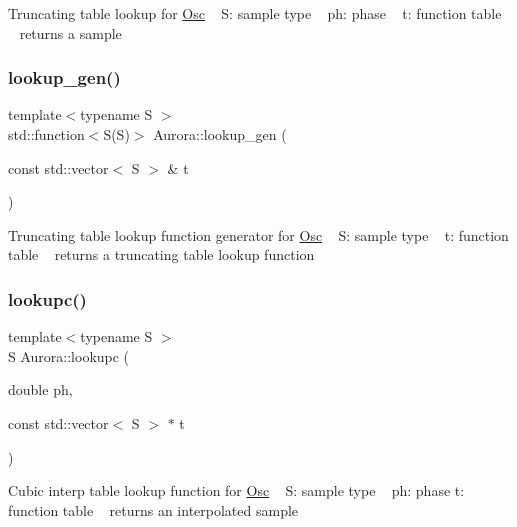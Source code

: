 Truncating table lookup for \hyperlink{class_aurora_1_1_osc}{Osc} ~\newline
S\+: sample type ~\newline
ph\+: phase ~\newline
t\+: function table ~\newline
returns a sample \mbox{\label{namespace_aurora_ade912bee8dbe0351b2193809ce592d8b}} 
\subsubsection{\texorpdfstring{lookup\+\_\+gen()}{lookup\_gen()}}
{\footnotesize\ttfamily template$<$typename S $>$ \\
std\+::function$<$S(S)$>$ Aurora\+::lookup\+\_\+gen (\begin{DoxyParamCaption}\item[{const std\+::vector$<$ S $>$ \&}]{t }\end{DoxyParamCaption})}

Truncating table lookup function generator for \hyperlink{class_aurora_1_1_osc}{Osc} ~\newline
S\+: sample type ~\newline
t\+: function table ~\newline
returns a truncating table lookup function \mbox{\label{namespace_aurora_afab81d7b8873e7850073124fcf37eeea}} 
\subsubsection{\texorpdfstring{lookupc()}{lookupc()}}
{\footnotesize\ttfamily template$<$typename S $>$ \\
S Aurora\+::lookupc (\begin{DoxyParamCaption}\item[{double}]{ph,  }\item[{const std\+::vector$<$ S $>$ $\ast$}]{t }\end{DoxyParamCaption})\hspace{0.3cm}{\ttfamily [inline]}}

Cubic interp table lookup function for \hyperlink{class_aurora_1_1_osc}{Osc} ~\newline
S\+: sample type ~\newline
ph\+: phase  t\+: function table ~\newline
returns an interpolated sample \mbox{\label{namespace_aurora_a3f915a11dad5ebfa5cbd6b2beca3b5f7}} 
